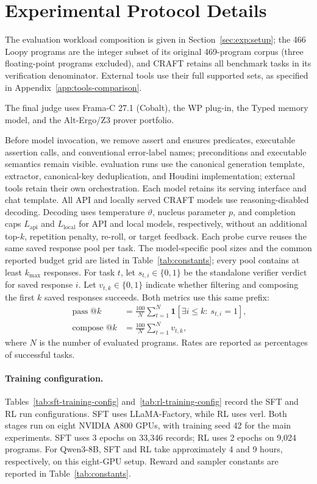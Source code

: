 \section{Experimental Protocol Details}
\label{app:experimental-protocol}

The evaluation workload composition is given in
Section~\ref{sec:exp:setup}; the 466 Loopy programs are the integer subset
of its original 469-program corpus (three floating-point programs excluded),
and CRAFT retains all benchmark tasks in its verification denominator.
External tools use their full supported sets, as specified in
Appendix~\ref{app:tools-comparison}.

The final judge uses Frama-C 27.1 (Cobalt), the WP plug-in, the Typed
memory model, and the Alt-Ergo/Z3 prover portfolio.

Before model invocation, we remove assert and ensures
predicates, executable assertion calls, and conventional error-label names;
preconditions and
executable semantics remain visible.  \sam{} evaluation
runs use the canonical generation template, extractor, canonical-key deduplication,
and Houdini implementation; external tools retain their own orchestration.
Each model retains its serving interface and chat template.  All API and
locally served CRAFT models use reasoning-disabled decoding.
Decoding uses temperature \(\vartheta\), nucleus parameter \(p\), and
completion caps \(L_{\mathrm{api}}\) and \(L_{\mathrm{local}}\) for API and
local models, respectively, without an additional top-\(k\), repetition
penalty, re-roll, or target feedback.  Each probe curve reuses the same saved
response pool per task.  The model-specific pool sizes and the common reported
budget grid are listed in Table~\ref{tab:constants}; every pool contains at
least \(k_{\max}\) responses.
For task \(t\), let \(s_{t,i}\in\{0,1\}\) be the standalone verifier
verdict for saved response \(i\).
Let \(v_{t,k}\in\{0,1\}\) indicate whether filtering and composing the first
\(k\) saved responses succeeds. Both metrics use this same prefix:
\[
\begin{aligned}
 \operatorname{pass}@k
  &=\frac{100}{N}\sum_{t=1}^N
    \mathbf{1}\!\left[\exists i\leq k:\ s_{t,i}=1\right],\\
 \operatorname{compose}@k
  &=\frac{100}{N}\sum_{t=1}^N v_{t,k},
\end{aligned}
\]
where \(N\) is the number of evaluated programs. Rates are reported as
percentages of successful tasks.

\paragraph{Training configuration.}
Tables~\ref{tab:sft-training-config} and~\ref{tab:rl-training-config}
record the SFT and RL run configurations. SFT uses LLaMA-Factory, while RL
uses verl. Both stages run on eight NVIDIA A800 GPUs, with training seed 42
for the main experiments. SFT uses 3 epochs on 33,346 records; RL uses
2 epochs on 9,024 programs. For Qwen3-8B, SFT and RL take approximately
4 and 9 hours, respectively, on this eight-GPU setup. Reward and sampler
constants are reported in Table~\ref{tab:constants}.

